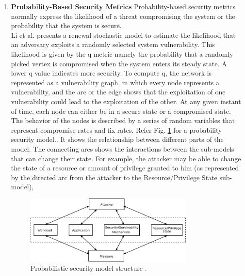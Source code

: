 \documentclass[pdftex,english,oribibl]{llncs}
\begin{document}
\begin{enumerate}[(1)]
{	Even though MTTF provide useful security level information, they do not take into account of partial or interrupted attacks (which can also cause damage to the system).}

	\item {\textbf{Probability-Based Security Metrics}\newline 
	Probability-based security metrics normally express the likelihood of a threat compromising the system or the probability that the system is secure.\\
	
 	Li et al. \cite{4695835_Li} presents a renewal stochastic model to estimate the likelihood that an adversary exploits a randomly selected system vulnerability. This likelihood is given by the q metric namely the probability that a randomly picked vertex is compromised when the system enters its steady state. A lower q value indicates more security. To compute q, the network is represented as a vulnerability graph, in which every node represents a vulnerability, and the arc or the edge shows that the exploitation of one vulnerability could lead to the exploitation of the other. At any given instant of time, each node can either be in a secure state or a compromised state. The behavior of the nodes is described by a series of random variables that represent compromise rates and fix rates. Refer Fig. \ref{fig:probablistic_sec_mod} for a probability security model.}. It shows the relationship between different parts of the model. The connecting arcs shows the interactions between the sub-models that can change their state. For example, the attacker may be able to change the state of a resource or amount of privilege granted to him (as represented by the directed arc from the attacker to the Resource/Privilege State sub-model),
 	\begin{figure}[h]
 		\centering\includegraphics[width=0.8\textwidth]{figures/probablistic_sec_mod.png}
 		\caption{Probabilistic security model structure \cite{1335467_Nicol}.}
 		\label{fig:probablistic_sec_mod}
 	\end{figure}
\end{enumerate}
\end{document}
